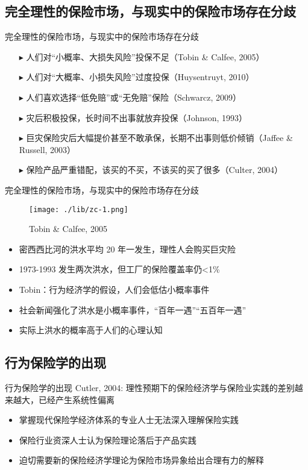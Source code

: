 \documentclass[presentation]{beamer}
\begin{document}
\subsection{完全理性的保险市场，与现实中的保险市场存在分歧}
\begin{frame}{完全理性的保险市场，与现实中的保险市场存在分歧}
	\begin{itemize}
		\item[$\blacktriangleright$] 人们对“小概率、大损失风险”投保不足（Tobin \& Calfee, 2005）
		\item[$\blacktriangleright$] 人们对“大概率、小损失风险”过度投保（Huysentruyt, 2010）
		\item[$\blacktriangleright$] 人们喜欢选择“低免赔”或“无免赔”保险（Schwarcz, 2009）
		\item[$\blacktriangleright$] 灾后积极投保，长时间不出事就放弃投保（Johnson, 1993）
		\item[$\blacktriangleright$] 巨灾保险灾后大幅提价甚至不敢承保，长期不出事则低价倾销（Jaffee \& Russell, 2003）
		\item[$\blacktriangleright$] 保险产品严重错配，该买的不买，不该买的买了很多（Culter, 2004）
	\end{itemize}
\end{frame}
\begin{frame}{完全理性的保险市场，与现实中的保险市场存在分歧}
	\begin{minipage}{.45\textwidth}
		\begin{figure}
			\texttt{[image: ./lib/zc-1.png]}
			\caption{Tobin \& Calfee, 2005}
		\end{figure}
	\end{minipage}
	\begin{minipage}{.45\textwidth}
		\begin{itemize}
			\item 密西西比河的洪水平均 20 年一发生，理性人会购买巨灾险
			\item 1973-1993 发生两次洪水，但工厂的保险覆盖率仍<1\%
			\item Tobin：行为经济学的假设，人们会低估小概率事件
			\item 社会新闻强化了洪水是小概率事件，“百年一遇”“五百年一遇”
			\item 实际上洪水的概率高于人们的心理认知
		\end{itemize}
	\end{minipage}
\end{frame}

\subsection{行为保险学的出现}
\begin{frame}{行为保险学的出现}
	Cutler, 2004: 理性预期下的保险经济学与保险业实践的差别越来越大，已经产生系统性偏离
	\begin{itemize}
		\item 掌握现代保险学经济体系的专业人士无法深入理解保险实践
		\item 保险行业资深人士认为保险理论落后于产品实践
		\item 迫切需要新的保险经济学理论为保险市场异象给出合理有力的解释
	\end{itemize}
\end{frame}
\end{document}
